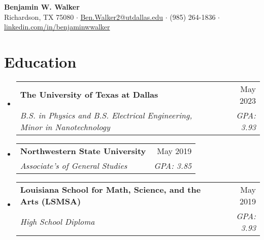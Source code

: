\documentclass[letterpaper,11pt]{article}
\makeatletter
\newcommand{\resumeSubheading}[4]{
  \vspace{-2pt}\item
    \begin{tabular*}{0.97\textwidth}[t]{l@{\extracolsep{\fill}}r}
      \textbf{#1} & #2 \\
      \textit{\small#3} & \textit{\small #4} \\
    \end{tabular*}\vspace{-7pt}
}
\newcommand{\resumeSubHeadingListStart}{\begin{itemize}[leftmargin=0.15in, label={}]}
\newcommand{\resumeSubHeadingListEnd}{\end{itemize}}
\makeatother
\begin{document}
\begin{center}
    \textbf{\Large Benjamin W. Walker} \\ \vspace{5pt}
    Richardson, TX 75080
    \hspace{1 pt} $\cdot$ \hspace{1 pt}
    \href{mailto:Ben.Walker2@utdallas.edu}{{Ben.Walker2@utdallas.edu}} 
    \hspace{1 pt} $\cdot$ \hspace{1 pt}
    (985) 264-1836
    \hspace{1 pt} $\cdot$ \hspace{1 pt}
    \href{https://www.linkedin.com/in/benjaminwwalker/}{{linkedin.com/in/benjaminwwalker}}
    \vspace{-10pt}
\end{center}

\vspace{-10pt}


\section{Education}
  \resumeSubHeadingListStart
    \resumeSubheading
      {The University of Texas at Dallas}{May 2023}
      {B.S. in Physics and B.S. Electrical Engineering, Minor in Nanotechnology}{GPA: 3.93}
    \resumeSubheading
      {Northwestern State University}{May 2019}
      {Associate's of General Studies}{GPA: 3.85}
    \resumeSubheading
    {Louisiana School for Math, Science, and the Arts \normalfont(LSMSA)}{May 2019}
    {High School Diploma}{GPA: 3.93}
  \resumeSubHeadingListEnd
\end{document}
